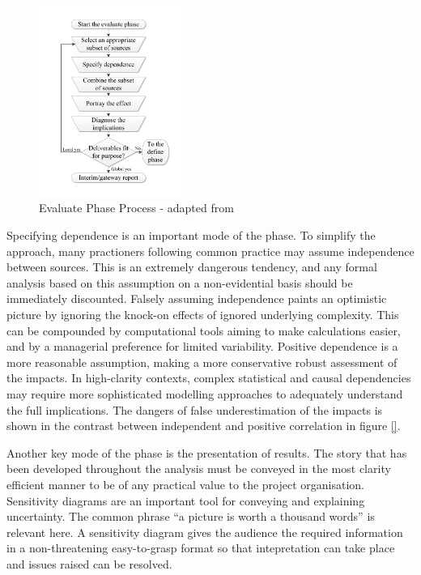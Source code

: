 \begin{figure}[!h]
  \centering
    \includegraphics[width = 0.42\textwidth]{./Figures/Evaluate.pdf} 
\caption{Evaluate Phase Process - adapted from \cite{chapman}}
\label{Figure:Evaluate}
\end{figure}

Specifying dependence is an important mode of the phase.
To simplify the approach, many practioners following common practice may assume independence between sources.
This is an extremely dangerous tendency, and any formal analysis based on this assumption on a non-evidential basis should be immediately discounted.
Falsely assuming independence paints an optimistic picture by ignoring the knock-on effects of ignored underlying complexity.
This can be compounded by computational tools aiming to make calculations easier, and by a managerial preference for limited variability. 
Positive dependence is a more reasonable assumption, making a more conservative robust assessment of the impacts. 
In high-clarity contexts, complex statistical and causal dependencies may require more sophisticated modelling approaches to adequately understand the full implications.
The dangers of false underestimation of the impacts is shown in the contrast between independent and positive correlation in figure \ref{}.


Another key mode of the phase is the presentation of results. 
The story that has been developed throughout the analysis must be conveyed in the most clarity efficient manner to be of any practical value to the project organisation.
Sensitivity diagrams are an important tool for conveying and explaining uncertainty.
The common phrase ``a picture is worth a thousand words'' is relevant here.
A sensitivity diagram gives the audience the required information in a non-threatening easy-to-grasp format so that intepretation can take place and issues raised can be resolved.

